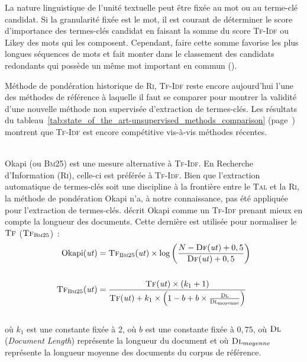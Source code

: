         La nature linguistique de l'unité textuelle peut être fixée au mot ou au
        terme-clé candidat. Si la granularité fixée est le mot, il est courant
        de déterminer le score d'importance des termes-clés candidat en faisant
        la somme du score \textsc{Tf-Idf} ou Likey des mots qui les composent.
        Cependant, faire cette somme favorise les plus longues séquences de mots
        et fait monter dans le classement des candidats redondants qui possède
        un même mot important en commun ().

        Méthode de pondération historique de \textsc{Ri}, \textsc{Tf-Idf} reste
        encore aujourd'hui l'une des méthodes de référence à laquelle il faut se
        comparer pour montrer la validité d'une nouvelle méthode non supervisée
        d'extraction de termes-clés. Les résultats du
        tableau~\ref{tab:state_of_the_art-unsupervised_methods_comparison}
        (page~\pageref{tab:state_of_the_art-unsupervised_methods_comparison})
        montrent que \textsc{Tf-Idf} est encore compétitive vis-à-vis méthodes
        récentes.

        ~\\Okapi (ou \textsc{Bm}25) \cite{robertson1999okapi} est une mesure
        alternative à \textsc{Tf-Idf}. En Recherche d'Information (\textsc{Ri}),
        celle-ci est préférée à \textsc{Tf-Idf}. Bien que l'extraction
        automatique de termes-clés soit une discipline à la frontière entre le
        \textsc{Tal} et la \textsc{Ri}, la méthode de pondération Okapi n'a, à
        notre connaissance, pas été appliquée pour l'extraction de termes-clés.
         décrit Okapi comme un \textsc{Tf-Idf}
        prenant mieux en compte la longueur des documents. Cette dernière est
        utilisée pour normaliser le $\textsc{Tf}$
        ($\textsc{Tf}_{\textsc{Bm}25}$)~:
        \begin{align}
          \text{Okapi}(\text{\textit{ut}}) &= \textsc{Tf}_{\textsc{Bm}25}(\text{\textit{ut}}) \times \log\left(\frac{N - \textsc{Df}(\text{\textit{ut}}) + 0,5}{\textsc{Df}(\text{\textit{ut}}) + 0,5}\right) \label{math:okapi}\\
          \notag\\
          \textsc{Tf}_{\textsc{Bm}25}(\text{\textit{ut}}) &= \frac{\textsc{Tf}(\text{\textit{ut}}) \times (k_1 + 1)}{\textsc{Tf}(\text{\textit{ut}}) + k_1 \times \left(1 - b + b \times \frac{\textsc{Dl}}{\textsc{Dl}_{\text{moyenne}}}\right)} \label{math:tf_bm25}
        \end{align}\\
        où $k_1$ est une constante fixée à 2, où $b$ est une constante fixée à
        $0,75$, où $\textsc{Dl}$ (\textit{Document Length}) représente la
        longueur du document et où $\textsc{Dl}_{moyenne}$ représente la
        longueur moyenne des documents du corpus de référence.

